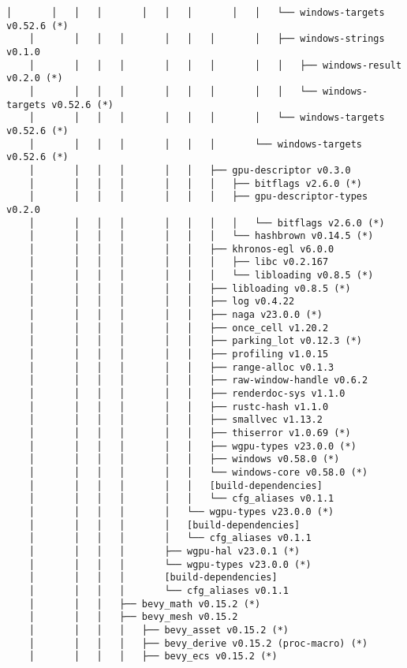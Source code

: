 \begin{lstlisting}[style=mystyle, caption={dependencias del proyecto}, label={lst:dependencias}]
    │       │   │   │       │   │   │       │   │   └── windows-targets v0.52.6 (*)
    │       │   │   │       │   │   │       │   ├── windows-strings v0.1.0
    │       │   │   │       │   │   │       │   │   ├── windows-result v0.2.0 (*)
    │       │   │   │       │   │   │       │   │   └── windows-targets v0.52.6 (*)
    │       │   │   │       │   │   │       │   └── windows-targets v0.52.6 (*)
    │       │   │   │       │   │   │       └── windows-targets v0.52.6 (*)
    │       │   │   │       │   │   ├── gpu-descriptor v0.3.0
    │       │   │   │       │   │   │   ├── bitflags v2.6.0 (*)
    │       │   │   │       │   │   │   ├── gpu-descriptor-types v0.2.0
    │       │   │   │       │   │   │   │   └── bitflags v2.6.0 (*)
    │       │   │   │       │   │   │   └── hashbrown v0.14.5 (*)
    │       │   │   │       │   │   ├── khronos-egl v6.0.0
    │       │   │   │       │   │   │   ├── libc v0.2.167
    │       │   │   │       │   │   │   └── libloading v0.8.5 (*)
    │       │   │   │       │   │   ├── libloading v0.8.5 (*)
    │       │   │   │       │   │   ├── log v0.4.22
    │       │   │   │       │   │   ├── naga v23.0.0 (*)
    │       │   │   │       │   │   ├── once_cell v1.20.2
    │       │   │   │       │   │   ├── parking_lot v0.12.3 (*)
    │       │   │   │       │   │   ├── profiling v1.0.15
    │       │   │   │       │   │   ├── range-alloc v0.1.3
    │       │   │   │       │   │   ├── raw-window-handle v0.6.2
    │       │   │   │       │   │   ├── renderdoc-sys v1.1.0
    │       │   │   │       │   │   ├── rustc-hash v1.1.0
    │       │   │   │       │   │   ├── smallvec v1.13.2
    │       │   │   │       │   │   ├── thiserror v1.0.69 (*)
    │       │   │   │       │   │   ├── wgpu-types v23.0.0 (*)
    │       │   │   │       │   │   ├── windows v0.58.0 (*)
    │       │   │   │       │   │   └── windows-core v0.58.0 (*)
    │       │   │   │       │   │   [build-dependencies]
    │       │   │   │       │   │   └── cfg_aliases v0.1.1
    │       │   │   │       │   └── wgpu-types v23.0.0 (*)
    │       │   │   │       │   [build-dependencies]
    │       │   │   │       │   └── cfg_aliases v0.1.1
    │       │   │   │       ├── wgpu-hal v23.0.1 (*)
    │       │   │   │       └── wgpu-types v23.0.0 (*)
    │       │   │   │       [build-dependencies]
    │       │   │   │       └── cfg_aliases v0.1.1
    │       │   │   ├── bevy_math v0.15.2 (*)
    │       │   │   ├── bevy_mesh v0.15.2
    │       │   │   │   ├── bevy_asset v0.15.2 (*)
    │       │   │   │   ├── bevy_derive v0.15.2 (proc-macro) (*)
    │       │   │   │   ├── bevy_ecs v0.15.2 (*)

\end{lstlisting}
